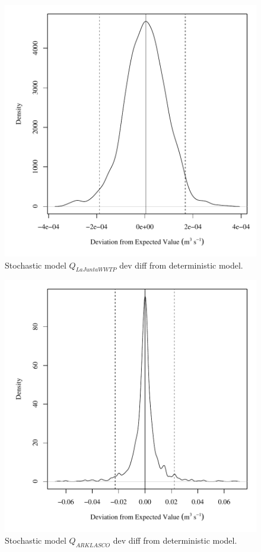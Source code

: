 \begin{center}
\begin{figure}[htbp]
	\includegraphics[width=6in]{"Figures/Results_USR/V dev diff qWTP"}
	\caption{Stochastic model $Q_{LaJuntaWWTP}$ dev diff from deterministic model.}
\end{figure}
\end{center}
\newpage

\begin{center}
\begin{figure}[htbp]
	\includegraphics[width=6in]{"Figures/Results_USR/V dev diff qout"}
	\caption{Stochastic model $Q_{ARKLASCO}$ dev diff from deterministic model.}
\end{figure}
\end{center}
\newpage

